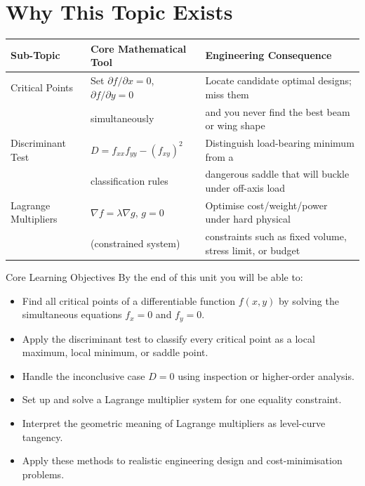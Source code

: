 \documentclass[12pt,a4paper]{article}
\begin{document}
\section{Why This Topic Exists}

\begin{center}
\begin{tabular}{@{}lll@{}}
\toprule
\textbf{Sub-Topic} & \textbf{Core Mathematical Tool} & \textbf{Engineering Consequence} \\
\midrule
Critical Points & Set $\partial f/\partial x = 0$, $\partial f/\partial y = 0$ & Locate candidate optimal designs; miss them \\
 & simultaneously & and you never find the best beam or wing shape \\
\midrule
Discriminant Test & $D = f_{xx}f_{yy} - (f_{xy})^{2}$ & Distinguish load-bearing minimum from a \\
 & classification rules & dangerous saddle that will buckle under off-axis load \\
\midrule
Lagrange Multipliers & $\nabla f = \lambda \nabla g$, $g = 0$ & Optimise cost/weight/power under hard physical \\
 & (constrained system) & constraints such as fixed volume, stress limit, or budget \\
\bottomrule
\end{tabular}
\end{center}

\begin{learnbox}{Core Learning Objectives}
By the end of this unit you will be able to:
\begin{itemize}
  \item Find all critical points of a differentiable function $f(x,y)$ by solving the simultaneous equations $f_x = 0$ and $f_y = 0$.
  \item Apply the discriminant test to classify every critical point as a local maximum, local minimum, or saddle point.
  \item Handle the inconclusive case $D = 0$ using inspection or higher-order analysis.
  \item Set up and solve a Lagrange multiplier system for one equality constraint.
  \item Interpret the geometric meaning of Lagrange multipliers as level-curve tangency.
  \item Apply these methods to realistic engineering design and cost-minimisation problems.
\end{itemize}
\end{learnbox}
\end{document}

